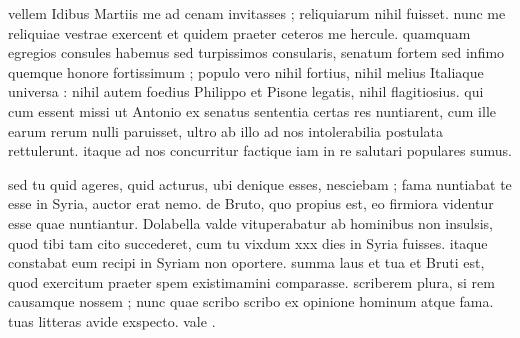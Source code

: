 


 vellem Idibus Martiis me ad cenam invitasses ; reliquiarum nihil fuisset. nunc me reliquiae vestrae exercent et quidem praeter ceteros me hercule. quamquam egregios consules habemus sed turpissimos consularis, senatum fortem sed infimo quemque honore fortissimum ; populo vero nihil fortius, nihil melius Italiaque universa : nihil autem foedius Philippo et Pisone legatis, nihil flagitiosius. qui cum essent missi ut Antonio ex senatus sententia certas res nuntiarent, cum ille earum rerum nulli paruisset, ultro ab illo ad nos intolerabilia postulata rettulerunt. itaque ad nos concurritur factique iam in re salutari populares sumus.

 sed tu quid ageres, quid acturus, ubi denique esses, nesciebam ; fama nuntiabat te esse in Syria, auctor erat nemo. de Bruto, quo propius est, eo firmiora videntur esse quae nuntiantur. Dolabella valde vituperabatur ab hominibus non insulsis, quod tibi tam cito succederet, cum tu vixdum xxx dies in Syria fuisses. itaque constabat eum recipi in Syriam non oportere. summa laus et tua et Bruti est, quod exercitum praeter spem existimamini comparasse. scriberem plura, si rem causamque nossem ; nunc quae scribo scribo ex opinione hominum atque fama. tuas litteras avide exspecto. vale .
